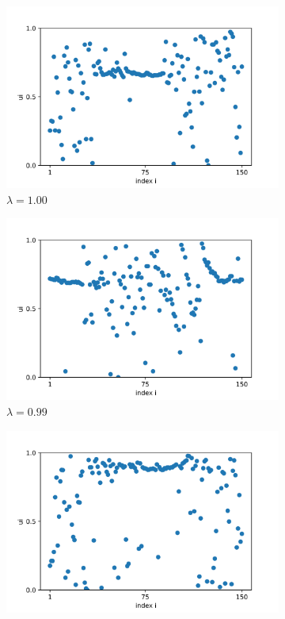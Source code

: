 \documentclass[a4paper,12pt]{article}
\begin{document}
\begin{figure}[H]
\begin{subfigure}{.32\textwidth}
  \centering
  \includegraphics[width=1\linewidth]{u_lambda=1.0_t=2000.png}  
  \caption{$\lambda=1.00$}
\end{subfigure}
\hfill
\begin{subfigure}{.32\textwidth}
  \centering
  \includegraphics[width=1\linewidth]{u_lambda=0.99_t=2000.png}  
  \caption{$\lambda=0.99$}
\end{subfigure}
\hfill
\begin{subfigure}{.32\textwidth}
  \centering
  \includegraphics[width=1\linewidth]{u_lambda=0.98_t=2000}  

\end{subfigure}
\end{figure}
\end{document}

